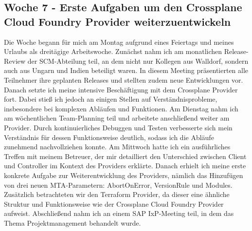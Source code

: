 \subsection{Woche 7 - Erste Aufgaben um den Crossplane Cloud Foundry Provider weiterzuentwickeln}
Die Woche begann für mich am Montag aufgrund eines Feiertags und meines
Urlaubs als dreitägige Arbeitswoche. Zunächst nahm ich am monatlichen Release-
Review der SCM-Abteilung teil, an dem nicht nur Kollegen aus Walldorf, sondern
auch aus Ungarn und Indien beteiligt waren. In diesem Meeting präsentierten alle
Teilnehmer ihre geplanten Releases und stellten zudem neue Entwicklungen vor.
Danach setzte ich meine intensive Beschäftigung mit dem Crossplane Provider fort.
Dabei stieß ich jedoch an einigen Stellen auf Verständnisprobleme, insbesondere bei
komplexen Abläufen und Funktionen.
Am Dienstag nahm ich am wöchentlichen Team-Planning teil und arbeitete
anschließend weiter am Provider. Durch kontinuierliches Debuggen und Testen
verbesserte sich mein Verständnis für dessen Funktionsweise deutlich, sodass ich
die Abläufe zunehmend nachvollziehen konnte.
Am Mittwoch hatte ich ein ausführliches Treffen mit meinem Betreuer, der mir
detailliert den Unterschied zwischen Client und Controller im Kontext des Providers
erklärte. Danach erhielt ich meine erste konkrete Aufgabe zur Weiterentwicklung des
Providers, nämlich das Hinzufügen von drei neuen MTA-Parametern: AbortOnError,
VersionRule und Modules. Zusätzlich betrachteten wir den Terraform Provider, da
dieser eine ähnliche Struktur und Funktionsweise wie der Crossplane Cloud Foundry
Provider aufweist. Abschließend nahm ich an einem SAP IxP-Meeting teil, in dem das
Thema Projektmanagement behandelt wurde.


